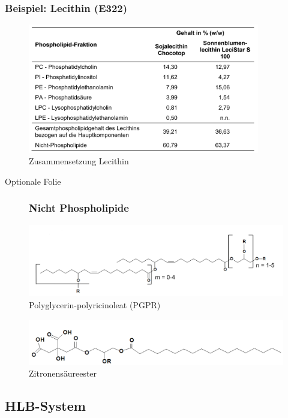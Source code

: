 \documentclass{beamer} %
\begin{document}
\begin{frame}
\frametitle{Beispiel: Lecithin (E322)}
\begin{figure}
\centering
\includegraphics[width = 0.9\textwidth]{ZusammensetzungLecithin.JPG}
\caption{Zusammensetzung Lecithin}
\end{figure}
\end{frame}

\begin{frame}
Optionale Folie
\begin{figure}
\frametitle{Nicht Phospholipide}
\centering
\includegraphics[width = 1\textwidth]{PGPR.JPG}
\caption{Polyglycerin-polyricinoleat (PGPR)}
\end{figure}
\begin{figure}
\centering
\includegraphics[width = 1\textwidth]{Zitronensaureester.JPG}
\caption{Zitronensäureester}
\end{figure}
\end{frame}

\subsection{HLB-System}
\end{document}
